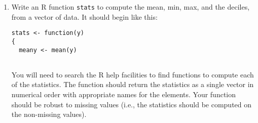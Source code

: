 \documentclass[11pt]{article}
\begin{document}
\begin{enumerate}
\item Write an R function \verb|stats| to compute the mean, min, max, and the deciles, from a vector of data. It should begin like this:
\begin{verbatim}
stats <- function(y)
{
  meany <- mean(y)
  
\end{verbatim}
You will need to search the R help facilities to find functions to compute each of the statistics. The function should return the statistics as a single vector in numerical order with appropriate names for the elements. Your function should be robust to missing values (i.e., the statistics should be computed on the non-missing values).


\end{enumerate}
\end{document}
